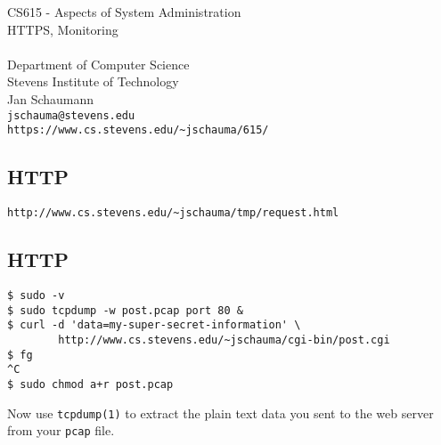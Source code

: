 \documentclass[xga]{xdvislides}
\begin{document}
\setfontphv

\lhead{\slidetitle}                               %
\cfoot{\relax}                               %
\rfoot{\Gray{\today}}

\newcommand{\smallish}{\fontsize{16}{16}\selectfont}

\vspace*{\fill}
\begin{center}
	\Hugesize
		CS615 - Aspects of System Administration\\ [1em]
		HTTPS, Monitoring\\ [1em]
	\hspace*{5mm}\blueline\\ [1em]
	\Normalsize
		Department of Computer Science\\
		Stevens Institute of Technology\\
		Jan Schaumann\\
		\verb+jschauma@stevens.edu+\\
		\verb+https://www.cs.stevens.edu/~jschauma/615/+
\end{center}
\vspace*{\fill}

\subsection{HTTP}
\begin{verbatim}
http://www.cs.stevens.edu/~jschauma/tmp/request.html
\end{verbatim}

\subsection{HTTP}
\begin{verbatim}
$ sudo -v
$ sudo tcpdump -w post.pcap port 80 &
$ curl -d 'data=my-super-secret-information' \
        http://www.cs.stevens.edu/~jschauma/cgi-bin/post.cgi
$ fg
^C
$ sudo chmod a+r post.pcap
\end{verbatim}

Now use {\tt tcpdump(1)} to extract the plain text data you sent
to the web server from your {\tt pcap} file.
\end{document}
